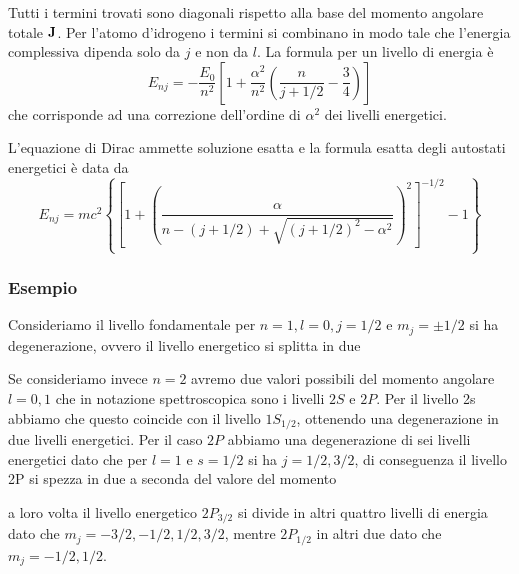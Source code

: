 Tutti i termini trovati sono diagonali rispetto alla base del momento angolare totale $\bold{J}$. Per l'atomo d'idrogeno i termini si combinano in modo tale che l'energia complessiva dipenda solo da $j$ e non da $l$. La formula per un livello di energia \`e 
\begin{equation}
	E_{nj} = - \frac{E_0}{n^2} \left[1 + \frac{\alpha^2}{n^2}\left(\frac{n}{j + 1/2} - \frac{3}{4} \right) \right]
\end{equation}
che corrisponde ad una correzione dell'ordine di $\alpha^2$ dei livelli energetici.

L'equazione di Dirac ammette soluzione esatta e la formula esatta degli autostati energetici \`e data da 
\begin{equation*}
	E_{nj} = mc^2 \left \{ \left [ 1 + \left( \frac{\alpha}{n-(j+1/2) + \sqrt{(j+1/2)^2-\alpha^2}}\right)^2\right]^{-1/2}-1 \right \}
\end{equation*}

\subsubsection{Esempio}
 Consideriamo il livello fondamentale per $n=1,l=0,j =1/2$ e $m_j = \pm 1/2$ si ha degenerazione, ovvero il livello energetico si splitta in due 
 \vspace{1cm}
\begin{center}
\end{center}
 Se consideriamo invece $n=2$ avremo due valori possibili del momento angolare $l = 0 ,1$ che in notazione spettroscopica sono i livelli $2S$ e $2P$. Per il livello 2s abbiamo che questo coincide con il livello $1S_{1/2}$, ottenendo una degenerazione in due livelli energetici. Per il caso $2P$ abbiamo una degenerazione di sei livelli energetici dato che per $l =1$ e $s = 1/2$ si ha $j = 1/2 , 3/2$, di conseguenza il livello 2P si spezza  in due a seconda del valore del momento 
 \vspace{1cm}
\begin{center}
\end{center} 
a loro volta il livello energetico $2P_{3/2}$ si divide in altri quattro livelli di energia dato che $m_j = -3/2,-1/2,1/2,3/2$, mentre $2P_{1/2}$ in altri due dato che $m_j = - 1/2,1/2$.

